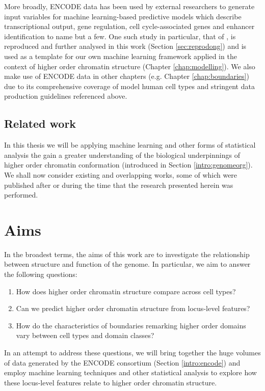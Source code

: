 \documentclass[a4paper,11pt,oneside]{book}
\begin{document}
More broadly, ENCODE data has been used by external researchers to generate input variables for machine learning-based predictive models which describe transcriptional output,\cite{Cheng2011} gene regulation,\cite{Althammer2012} cell cycle-associated genes \cite{Cheng2013} and enhancer identification\cite{Rajagopal2013} to name but a few. One such study in particular, that of \citet{Dong2012}, is reproduced and further analysed in this work (Section \ref{sec:reprodong}) and is used as a template for our own machine learning framework applied in the context of higher order chromatin structure (Chapter \ref{chap:modelling}). We also make use of ENCODE data in other chapters (e.g. Chapter \ref{chap:boundaries}) due to its comprehensive coverage of model human cell types and stringent data production guidelines referenced above.

\subsection{Related work}
In this thesis we will be applying machine learning and other forms of statistical analysis the gain a greater understanding of the biological underpinnings of higher order chromatin conformation (introduced in Section \ref{intro:genomeorg}). We shall now consider existing and overlapping works, some of which were published after or during the time that the research presented herein was performed.





\section{Aims}

In the broadest terms, the aims of this work are to investigate the relationship between structure and function of the genome. In particular, we aim to answer the following questions: 
\begin{enumerate}
\item How does higher order chromatin structure compare across cell types?
\item Can we predict higher order chromatin structure from locus-level features?
\item How do the characteristics of boundaries remarking higher order domains vary between cell types and domain classes?
\end{enumerate}

In an attempt to address these questions, we will bring together the huge volumes of data generated by the ENCODE consortium (Section \ref{intro:encode}) and employ machine learning techniques and other statistical analysis to explore how these locus-level features relate to higher order chromatin structure. 

\ifstandalone
\begin{small}

\end{small}
\fi
\end{document}
